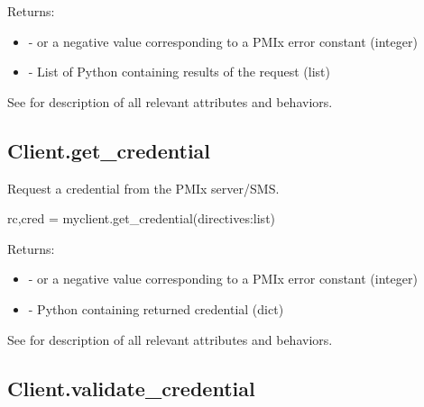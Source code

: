 Returns:

\begin{itemize}
    \item {} -  or a negative value corresponding to a PMIx error constant (integer)
    \item {} - List of Python  containing results of the request (list)
\end{itemize}

See  for description of all relevant attributes and behaviors.


\subsection{Client.get_credential}

\summary

Request a credential from the PMIx server/SMS.

\format

\pyspecificstart
\begin{codepar}
rc,cred = myclient.get_credential(directives:list)
\end{codepar}
\pyspecificend

\begin{arglist}
\end{arglist}

Returns:

\begin{itemize}
    \item {} -  or a negative value corresponding to a PMIx error constant (integer)
    \item {} - Python  containing returned credential (dict)
\end{itemize}

See  for description of all relevant attributes and behaviors.


\subsection{Client.validate_credential}

